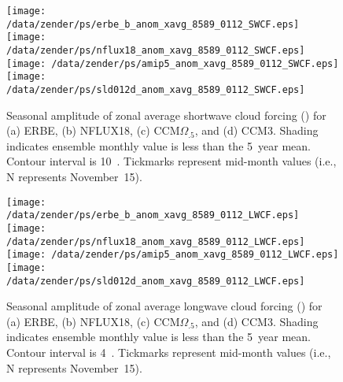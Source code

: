 \documentclass[twocolumn,final,11pt]{article}
\begin{document}
\begin{figure}
\begin{center}
\texttt{[image: /data/zender/ps/erbe\_b\_anom\_xavg\_8589\_0112\_SWCF.eps]}\vfill
\texttt{[image: /data/zender/ps/nflux18\_anom\_xavg\_8589\_0112\_SWCF.eps]}\vfill
\texttt{[image: /data/zender/ps/amip5\_anom\_xavg\_8589\_0112\_SWCF.eps]}\vfill
\texttt{[image: /data/zender/ps/sld012d\_anom\_xavg\_8589\_0112\_SWCF.eps]}\vfill
\end{center}
\caption[Seasonal amplitude of zonal average shortwave cloud forcing
SWCF for ERBE, NFLUX18, CCM$\Omega_{.5}$, and CCM3]{
Seasonal amplitude of zonal average shortwave cloud 
forcing (\wxmS) for (a) ERBE, (b) NFLUX18, (c) CCM$\Omega_{.5}$, and (d)
CCM3.  
Shading indicates ensemble monthly value is less than the 5~year
mean. 
Contour interval is 10~\wxmS.
Tickmarks represent mid-month values (i.e., N represents
November~15). 
\label{fig:anom_xavg_8589_0112_SWCF}}   
\end{figure}

\begin{figure}
\begin{center}
\texttt{[image: /data/zender/ps/erbe\_b\_anom\_xavg\_8589\_0112\_LWCF.eps]}\vfill
\texttt{[image: /data/zender/ps/nflux18\_anom\_xavg\_8589\_0112\_LWCF.eps]}\vfill
\texttt{[image: /data/zender/ps/amip5\_anom\_xavg\_8589\_0112\_LWCF.eps]}\vfill
\texttt{[image: /data/zender/ps/sld012d\_anom\_xavg\_8589\_0112\_LWCF.eps]}\vfill
\end{center}
\caption[Seasonal amplitude of zonal average longwave cloud forcing 
LWCF for ERBE, NFLUX18, CCM$\Omega_{.5}$, and CCM3]{
Seasonal amplitude of zonal average longwave cloud 
forcing (\wxmS) for (a) ERBE, (b) NFLUX18, (c) CCM$\Omega_{.5}$, and (d)
CCM3.  
Shading indicates ensemble monthly value is less than the 5~year
mean. 
Contour interval is 4~\wxmS.
Tickmarks represent mid-month values (i.e., N represents
November~15). 
\label{fig:anom_xavg_8589_0112_LWCF}}   
\end{figure}
\clearpage
\end{document}
